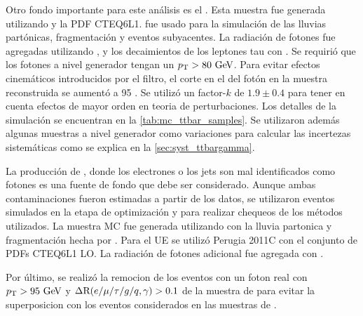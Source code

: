 Otro fondo importante para este análisis es el {\ttgam}. Esta muestra fue
generada utilizando {\madgraph}\cite{Alwall:2007st} y la PDF CTEQ6L1.
{\pythiasix}\cite{pythia} fue usado para la simulación de las lluvias
partónicas, fragmentación y eventos subyacentes. La radiación de fotones fue
agregadas utilizando {\photos}\cite{photos}, y los decaimientos de los leptones
tau con {\tauola}\cite{tauola}. Se requirió que los fotones a nivel generador
tengan un $\pt > 80 \gev$. Para evitar efectos cinemáticos introducidos por el
filtro, el corte en el {\pt} del fotón en la muestra reconstruida se aumentó a
95 {\gev}. Se utilizó un factor-$k$ de $1.9 \pm 0.4$\cite{Melnikov:2011ta, tth}
para tener en cuenta efectos de mayor orden en teoria de perturbaciones.
Los detalles de la simulación se encuentran en la \cref{tab:mc_ttbar_samples}.
Se utilizaron además algunas muestras a nivel generador como variaciones para calcular
las incertezas sistemáticas como se explica en la \cref{sec:syst_ttbargamma}.

La producción de {\ttbar}, donde los electrones o los jets son mal identificados
como fotones es una fuente de fondo que debe ser considerado. Aunque ambas
contaminaciones fueron estimadas a partir de los datos, se utilizaron eventos simulados
en la etapa de optimización y para realizar chequeos de los métodos utilizados.
La
muestra MC fue generada utilizando
{\powheg}\cite{Nason:2004rx,Frixione:2007vw,Alioli:2010xd} con la lluvia
partonica y fragmentación hecha por {\pythia}. Para el UE se utilizó Perugia
2011C con el
conjunto de PDFs CTEQ6L1 LO. La radiación de fotones adicional fue agregada con
{\photos}\cite{photos}.

Por último, se realizó la remocion
de los eventos con un foton real con $\pt > 95 \gev$ y $\Delta{\rm R}(e/\mu/\tau/g/q,\gamma) > 0.1$ de la muestra de {\ttbar} para evitar la superposicion con los eventos
considerados en las muestras de {\ttgam}.


